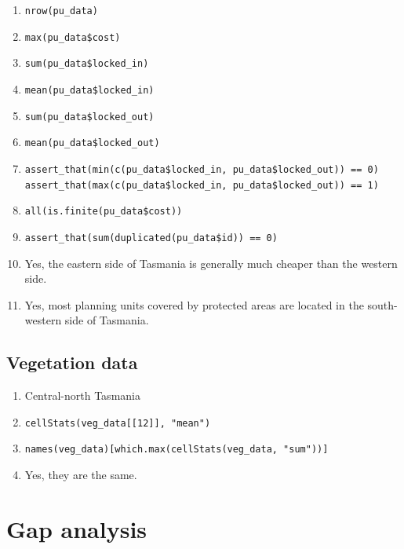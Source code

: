 \documentclass[
  12pt,
]{book}
\makeatletter
\providecommand{\tightlist}{%
  \setlength{\itemsep}{0pt}\setlength{\parskip}{0pt}}
\newenvironment{kframe}{%
\medskip{}
\setlength{\fboxsep}{.8em}
 \def\at@end@of@kframe{}%
 \ifinner\ifhmode%
  \def\at@end@of@kframe{\end{minipage}}%
  \begin{minipage}{\columnwidth}%
 \fi\fi%
 \def\FrameCommand##1{\hskip\@totalleftmargin \hskip-\fboxsep
 \colorbox{shadecolor}{##1}\hskip-\fboxsep
     \hskip-\linewidth \hskip-\@totalleftmargin \hskip\columnwidth}%
 \MakeFramed {\advance\hsize-\width
   \@totalleftmargin\z@ \linewidth\hsize
   \@setminipage}}%
 {\par\unskip\endMakeFramed%
 \at@end@of@kframe}
\newenvironment{rmdblock}[1]
  {
  \begin{itemize}
  \renewcommand{\labelitemi}{
    \raisebox{-.7\height}[0pt][0pt]{
      {\setkeys{Gin}{width=3em,keepaspectratio}\texttt{[image: images/\#1]}}
    }
  }
  \setlength{\fboxsep}{1em}
  \begin{kframe}
  \item
  }
  {
  \end{kframe}
  \end{itemize}
  }
\newenvironment{rmdanswer}
  {\begin{rmdblock}{answer}}
  {\end{rmdblock}}
\makeatother
\begin{document}
\begin{rmdanswer}
\begin{enumerate}
\def\labelenumi{\arabic{enumi}.}
\tightlist
\item
  \texttt{nrow(pu\_data)}
\item
  \texttt{max(pu\_data\$cost)}
\item
  \texttt{sum(pu\_data\$locked\_in)}
\item
  \texttt{mean(pu\_data\$locked\_in)}
\item
  \texttt{sum(pu\_data\$locked\_out)}
\item
  \texttt{mean(pu\_data\$locked\_out)}
\item
  \texttt{assert\_that(min(c(pu\_data\$locked\_in,\ pu\_data\$locked\_out))\ ==\ 0)}
  \texttt{assert\_that(max(c(pu\_data\$locked\_in,\ pu\_data\$locked\_out))\ ==\ 1)}
\item
  \texttt{all(is.finite(pu\_data\$cost))}
\item
  \texttt{assert\_that(sum(duplicated(pu\_data\$id))\ ==\ 0)}
\item
  Yes, the eastern side of Tasmania is generally much cheaper than the western side.
\item
  Yes, most planning units covered by protected areas are located in the south-western side of Tasmania.
\end{enumerate}
\end{rmdanswer}

\clearpage

\hypertarget{vegetation-data-1}{%
\subsection{Vegetation data}\label{vegetation-data-1}}

\begin{rmdanswer}
\begin{enumerate}
\def\labelenumi{\arabic{enumi}.}
\tightlist
\item
  Central-north Tasmania
\item
  \texttt{cellStats(veg\_data{[}{[}12{]}{]},\ "mean")}
\item
  \texttt{names(veg\_data){[}which.max(cellStats(veg\_data,\ "sum")){]}}
\item
  Yes, they are the same.
\end{enumerate}
\end{rmdanswer}

\hypertarget{gap-analysis-1}{%
\section{Gap analysis}\label{gap-analysis-1}}
\end{document}
